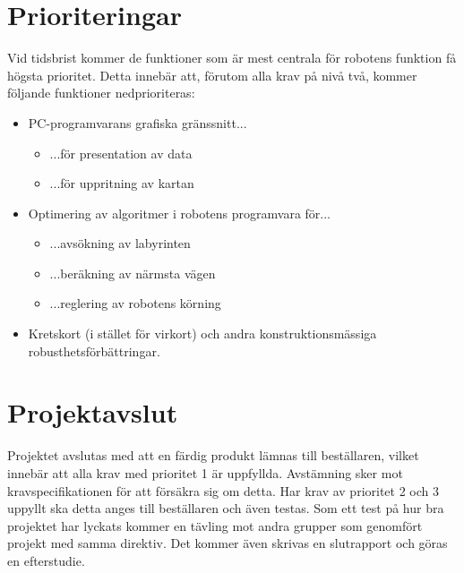 \documentclass[11pt]{article}
\begin{document}
\begin{flushleft}
\section{Prioriteringar}
Vid tidsbrist kommer de funktioner som är mest centrala för robotens funktion få högsta prioritet. Detta innebär att, förutom alla krav på nivå två, kommer följande funktioner nedprioriteras:
\begin{itemize}
	\item PC-programvarans grafiska gränssnitt... 
	\begin{itemize}	
		\item ...för presentation av data
		\item ...för uppritning av kartan
	\end{itemize}
	\item Optimering av algoritmer i robotens programvara för...
	\begin{itemize}
		\item ...avsökning av labyrinten
		\item ...beräkning av närmsta vägen
		\item ...reglering av robotens körning
	\end{itemize}
	\item Kretskort (i stället för virkort) och andra konstruktionsmässiga robusthetsförbättringar.
\end{itemize}

\pagebreak
\section{Projektavslut}
Projektet avslutas med att en färdig produkt lämnas till beställaren, vilket innebär att alla krav med prioritet 1 är uppfyllda. Avstämning sker mot kravspecifikationen för att försäkra sig om detta. Har krav av prioritet 2 och 3 uppyllt ska detta anges till beställaren och även testas. Som ett test på hur bra projektet har lyckats kommer en tävling mot andra grupper som genomfört projekt med samma direktiv. Det kommer även skrivas en slutrapport och göras en efterstudie. 

\end{flushleft}
\end{document}

